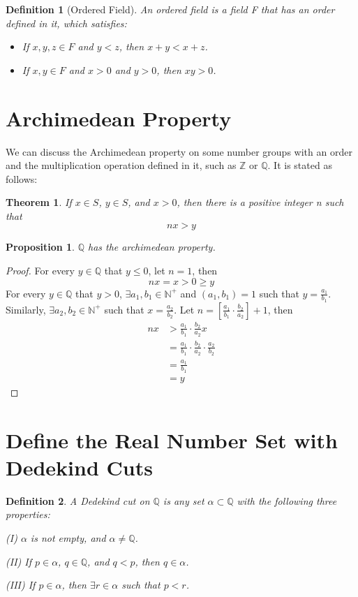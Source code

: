 \documentclass[onecolumn]{article}
\newtheorem{definition}{Definition}[section]
\newtheorem{theorem}{Theorem}[section]
\newtheorem{proposition}{Proposition}[section]
\begin{document}
\begin{definition}[Ordered Field]
  An ordered field is a field F that has an order defined in it, which satisfies:
  \begin{itemize}
    \item If $x, y, z \in F$ and $y < z$, then $x + y < x + z$.
    \item If $x, y \in F$ and $x > 0$ and $y > 0$, then $xy > 0$.
  \end{itemize}
\end{definition}

\section{Archimedean Property}
We can discuss the Archimedean property on some number groups with an order and 
the multiplication operation defined in it, such as $\mathbb{Z}$ or $\mathbb{Q}$.
It is stated as follows:
\begin{theorem}
  If $x \in S$, $y \in S$, and $x > 0$, then there is a positive integer n such 
  that
  \[
    nx > y
  \]
\end{theorem}

\begin{proposition}
  $\mathbb{Q}$ has the archimedean property.
\end{proposition}
\begin{proof}
  For every $y \in \mathbb{Q}$ that $y \leq 0$, let $n = 1$, then
  \[
    nx = x > 0 \geq y
  \]
  For every $y \in \mathbb{Q}$ that $y > 0$, $\exists a_1, b_1 \in \mathbb{N^+}$ 
  and $(a_1, b_1) = 1$ such that $y = \frac{a_1}{b_1}$. Similarly, 
  $\exists a_2, b_2 \in \mathbb{N^+}$ such that $x = \frac{a_2}{b_2}$. Let 
  $n = [\frac{a_1}{b_1} \cdot \frac{b_2}{a_2}] + 1$, then
  \[
    \begin{split}
      nx &> \frac{a_1}{b_1} \cdot \frac{b_2}{a_2} x \\
         &= \frac{a_1}{b_1} \cdot \frac{b_2}{a_2} \cdot \frac{a_2}{b_2} \\
         &= \frac{a_1}{b_1} \\
         &= y
    \end{split}
  \]
\end{proof}

\section{Define the Real Number Set with Dedekind Cuts}

\begin{definition}
  A Dedekind cut on $\mathbb{Q}$ is any set $\alpha \subset \mathbb{Q}$ with the
  following three properties:
  \begin{description}
    \item{(I)} $\alpha$ is not empty, and $\alpha \neq \mathbb{Q}$.
    \item{(II)} If $p \in \alpha$, $q \in \mathbb{Q}$, and $q < p$, then 
    $q \in \alpha$.
    \item{(III)} If $p \in \alpha$, then $\exists r \in \alpha$ such that $p < r$.
  \end{description}
\end{definition}
\end{document}
